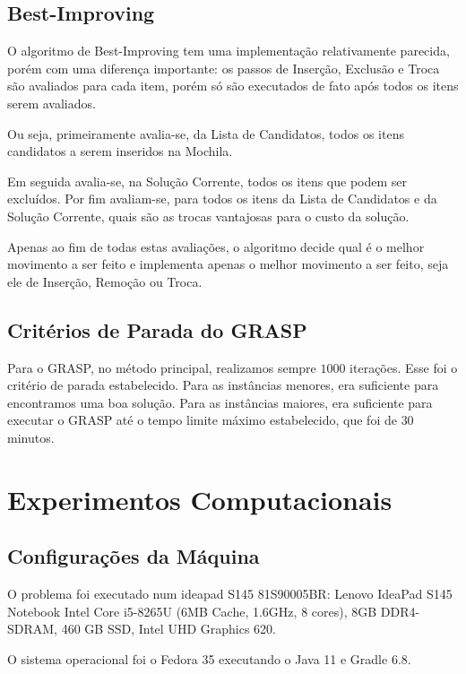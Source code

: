 \documentclass{article}
\theoremstyle{definition}
\begin{document}
\subsection{Best-Improving}

O algoritmo de Best-Improving tem uma implementação relativamente parecida, porém com uma diferença importante: os passos de Inserção, Exclusão e Troca são avaliados para cada item, porém só são executados de fato após todos os itens serem avaliados.

Ou seja, primeiramente avalia-se, da Lista de Candidatos, todos os itens candidatos a serem inseridos na Mochila.

Em seguida avalia-se, na Solução Corrente, todos os itens que podem ser excluídos. Por fim avaliam-se, para todos os itens da Lista de Candidatos e da Solução Corrente, quais são as trocas vantajosas para o custo da solução.

Apenas ao fim de todas estas avaliações, o algoritmo decide qual é o melhor movimento a ser feito e implementa apenas o melhor movimento a ser feito, seja ele de Inserção, Remoção ou Troca.


\subsection{Critérios de Parada do GRASP}
Para o GRASP, no método principal, realizamos sempre $1000$ iterações. Esse foi o critério de parada estabelecido. Para as instâncias menores, era suficiente para encontramos uma boa solução. Para as instâncias maiores, era suficiente para executar o GRASP até o tempo limite máximo estabelecido, que foi de $30$ minutos.

\section{Experimentos Computacionais}

\subsection{Configurações da Máquina}
O problema foi executado num ideapad S145 81S90005BR: Lenovo IdeaPad S145 Notebook Intel Core i5-8265U (6MB Cache, 1.6GHz, 8 cores), 8GB DDR4-SDRAM, 460 GB SSD, Intel UHD Graphics 620.

O sistema operacional foi o Fedora 35 executando o Java 11 e Gradle 6.8.
\end{document}
